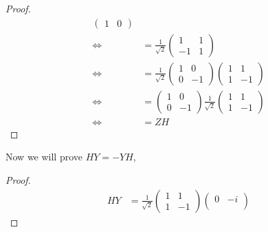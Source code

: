 \documentclass[addpoints]{exam}
\begin{document}
\begin{questions}
\begin{solution}
\begin{proof}
\begin{align*}
\begin{pmatrix}
					                                                 1 & 0
				                                                 \end{pmatrix} \\
				\iff \qquad & = \frac{1}{\sqrt{2}} \begin{pmatrix}
					                                   1  & 1 \\
					                                   -1 & 1
				                                   \end{pmatrix}               \\
				\iff \qquad & = \frac{1}{\sqrt{2}} \begin{pmatrix}
					                                   1 & 0  \\
					                                   0 & -1
				                                   \end{pmatrix} \begin{pmatrix}
					                                                 1 & 1  \\
					                                                 1 & -1
				                                                 \end{pmatrix} \\
				\iff \qquad & =  \begin{pmatrix}
					                 1 & 0  \\
					                 0 & -1
				                 \end{pmatrix} \frac{1}{\sqrt{2}}\begin{pmatrix}
					                                                 1 & 1  \\
					                                                 1 & -1
				                                                 \end{pmatrix} \\
				\iff \qquad & = ZH
			\end{align*}
		\end{proof}
		Now we will prove \(HY=-YH\),
		\begin{proof}
			\begin{align*}
				HY          & = \frac{1}{\sqrt{2}} \begin{pmatrix}
					                                   1 & 1  \\
					                                   1 & -1
				                                   \end{pmatrix} \begin{pmatrix}
					                                                 0 & -i \\

\end{pmatrix}
\end{align*}
\end{proof}
\end{solution}
\end{questions}
\end{document}
